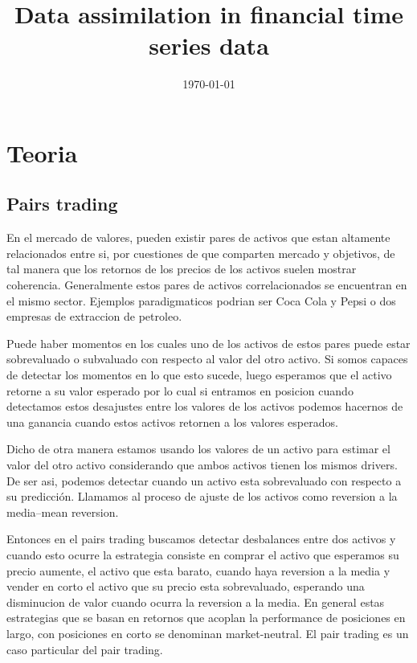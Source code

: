 \documentclass{myarticle}
\date{\today}
\title{Data assimilation in financial time series data}
\begin{document}
\maketitle

\section{Teoria}
\label{sec:org2dc5380}

\subsection{Pairs trading}
\label{sec:org6eea304}

En el mercado de valores, pueden existir pares de activos que estan altamente relacionados entre si, por cuestiones de que comparten mercado y objetivos, de tal manera que los retornos de los precios de los activos suelen mostrar coherencia. Generalmente estos pares de activos correlacionados se encuentran en el mismo sector.  Ejemplos paradigmaticos podrian ser Coca Cola y Pepsi o dos empresas de extraccion de petroleo.

Puede haber momentos en los cuales uno de los activos de estos pares puede estar sobrevaluado o subvaluado con respecto al valor del otro activo. Si somos capaces de detectar los momentos en lo que esto sucede, luego esperamos que el activo retorne a su valor esperado por lo cual si entramos en posicion cuando detectamos estos  desajustes entre los valores de los activos podemos hacernos de una ganancia cuando estos activos retornen a los valores esperados.

Dicho de otra manera estamos usando los valores de un activo para estimar el valor del otro activo considerando que ambos activos tienen los mismos drivers. De ser asi, podemos detectar cuando un activo esta sobrevaluado con respecto a su predicci\'on. Llamamos al proceso de ajuste de los activos como reversion a la media--mean reversion.

Entonces en el pairs trading buscamos detectar desbalances entre dos activos  y cuando esto ocurre la estrategia consiste en comprar el activo que esperamos su precio aumente, el activo que esta barato, cuando haya reversion a la media y vender en corto el activo que su precio esta sobrevaluado, esperando una disminucion de valor cuando ocurra la reversion a la media. En general estas estrategias que se basan en retornos que acoplan la performance de posiciones en largo, con posiciones en corto se denominan market-neutral. El pair trading es un caso particular del pair trading.
\end{document}
